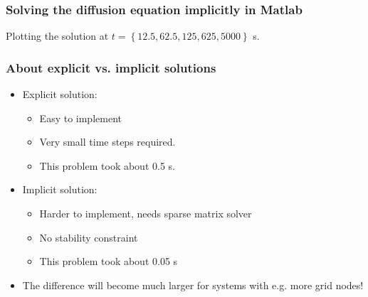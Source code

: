 \documentclass[11pt,table,final,fleqn,xcolor={usenames,dvipsnames,table}]{beamer}
\begin{document}
\begin{frame}[fragile]
  \frametitle{Solving the diffusion equation implicitly in Matlab}
  Plotting the solution at $t=\left\{12.5,62.5,125,625,5000\right\}$ \si{\second}.
\end{frame}

\begin{frame}
  \frametitle{About explicit vs. implicit solutions}
  \begin{itemize}
    \item Explicit solution:
    \begin{itemize}
      \item Easy to implement
      \item Very small time steps required.
      \item This problem took about 0.5 \si{\second}.
    \end{itemize}
    \item Implicit solution:
    \begin{itemize}
      \item Harder to implement, needs sparse matrix solver
      \item No stability constraint
      \item This problem took about 0.05 \si{\second}
    \end{itemize}
    \item The difference will become much larger for systems with e.g. more grid nodes!
  \end{itemize}
\end{frame}
\end{document}
